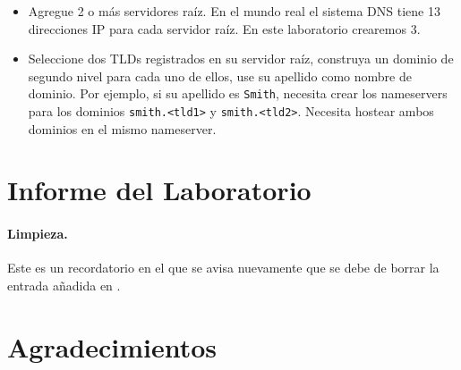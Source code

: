 \begin{itemize}
\item Agregue 2 o más servidores raíz. En el mundo real el sistema DNS tiene 13 direcciones IP para cada servidor raíz. En este laboratorio crearemos 3.

\item Seleccione dos TLDs registrados en su servidor raíz, construya un dominio de segundo nivel para cada uno de ellos, use su apellido como nombre de dominio.
Por ejemplo, si su apellido es \texttt{Smith}, necesita crear los nameservers para los dominios \texttt{smith.<tld1>} y \texttt{smith.<tld2>}.
Necesita hostear ambos dominios en el mismo nameserver.
\end{itemize}





 


\section{Informe del Laboratorio}



\paragraph{Limpieza.} Este es un recordatorio en el que se avisa nuevamente que se debe de borrar la entrada añadida en .

\section*{Agradecimientos}





